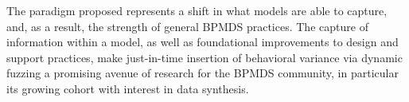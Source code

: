 \documentclass[12pt]{llncs}  %
\begin{document}
The paradigm proposed represents a shift in what models are able to capture,
and, as a result, the strength of general BPMDS practices. The capture of
information within a model, as well as foundational improvements
to design and support practices, make just-in-time insertion of behavioral
variance via dynamic fuzzing a promising avenue of research for the BPMDS
community, in particular its growing cohort with interest in data synthesis.
\par




\end{document}
